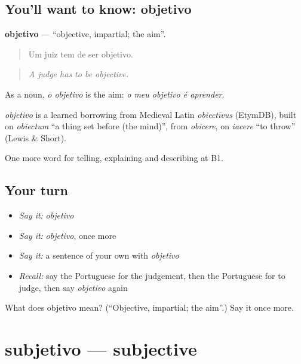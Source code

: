 \subsection*{You'll want to know: objetivo}
\textbf{objetivo} — \textquotedblleft{}objective, impartial; the aim\textquotedblright{}.

\begin{quote}
Um juiz tem de ser objetivo.
\end{quote}

\begin{quote}
\emph{A judge has to be objective.}
\end{quote}

As a noun, \emph{o objetivo} is the aim: \emph{o meu objetivo é aprender}.

\begin{cousinweb}
\emph{objetivo} is a learned borrowing from Medieval Latin \emph{obiectīvus} (EtymDB), built on \emph{obiectum} \textquotedblleft{}a thing set before (the mind)\textquotedblright{}, from \emph{obicere}, on \emph{iacere} \textquotedblleft{}to throw\textquotedblright{} (Lewis \& Short).
\end{cousinweb}

\begin{grammarlens}[title={What you've built}]
One more word for telling, explaining and describing at B1.
\end{grammarlens}

\subsection*{Your turn}
\begin{itemize}
\raggedright
  \item \emph{Say it:} \emph{objetivo}
  \item \emph{Say it:} \emph{objetivo}, once more
  \item \emph{Say it:} a sentence of your own with \emph{objetivo}
  \item \emph{Recall:} say the Portuguese for the judgement, then the Portuguese for to judge, then say \emph{objetivo} again
\end{itemize}

\begin{tcolorbox}[breakable,colback=teal!4,colframe=teal!35!black,title={Before you move on}]
What does objetivo mean? (\textquotedblleft{}Objective, impartial; the aim\textquotedblright{}.) Say it once more.
\end{tcolorbox}
\section[subjetivo]{subjetivo — subjective}

